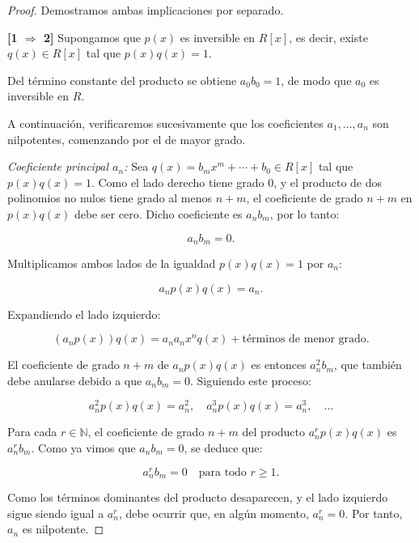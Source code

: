 \begin{proof}
	Demostramos ambas implicaciones por separado.
	
	\medskip
	
	\noindent \textbf{[1 $\Rightarrow$ 2]} Supongamos que \( p(x) \) es inversible en \( R[x] \), es decir, existe \( q(x) \in R[x] \) tal que \( p(x)q(x) = 1 \).
	
	Del término constante del producto se obtiene \( a_0 b_0 = 1 \), de modo que \( a_0 \) es inversible en \( R \).
	
	A continuación, verificaremos sucesivamente que los coeficientes \( a_1, \dots, a_n \) son nilpotentes, comenzando por el de mayor grado.
	
	\medskip
	
\medskip

\noindent \textit{Coeficiente principal \( a_n \):} Sea \( q(x) = b_m x^m + \cdots + b_0 \in R[x] \) tal que \( p(x) q(x) = 1 \). Como el lado derecho tiene grado 0, y el producto de dos polinomios no nulos tiene grado al menos \( n + m \), el coeficiente de grado \( n + m \) en \( p(x) q(x) \) debe ser cero. Dicho coeficiente es \( a_n b_m \), por lo tanto:


\[
a_n b_m = 0.
\]



Multiplicamos ambos lados de la igualdad \( p(x) q(x) = 1 \) por \( a_n \):


\[
a_n p(x) q(x) = a_n.
\]


Expandiendo el lado izquierdo:


\[
(a_n p(x)) q(x) = a_n a_n x^n q(x) + \text{términos de menor grado}.
\]


El coeficiente de grado \( n + m \) de \( a_n p(x) q(x) \) es entonces \( a_n^2 b_m \), que también debe anularse debido a que $a_nb_m=0$. Siguiendo este proceso:


\[
a_n^2 p(x) q(x) = a_n^2, \quad a_n^3 p(x) q(x) = a_n^3, \quad \ldots
\]


Para cada \( r \in \mathbb{N} \), el coeficiente de grado \( n + m \) del producto \( a_n^r p(x) q(x) \) es \( a_n^{r} b_m \). Como ya vimos que \( a_n b_m = 0 \), se deduce que:


\[
a_n^r b_m = 0 \quad \text{para todo } r \geq 1.
\]



Como los términos dominantes del producto desaparecen, y el lado izquierdo sigue siendo igual a \( a_n^r \), debe ocurrir que, en algún momento, \( a_n^r = 0 \). Por tanto, \( a_n \) es nilpotente.



\end{proof}
